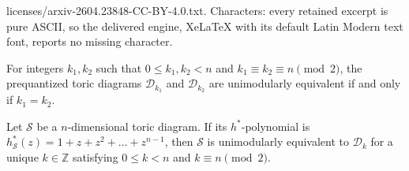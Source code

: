 \documentclass[10pt,a4paper]{amsart}
\newcommand{\Ss}{{\mathcal S}}
\newcommand{\Z}{\mathbb Z}
\begin{document}
licenses/arxiv-2604.23848-CC-BY-4.0.txt. Characters: every retained excerpt is pure ASCII, so the delivered engine, XeLaTeX with its default Latin Modern text font, reports no missing character.
\begin{theorem} \label{thm:uniqueness}
For integers $k_1, k_2$ such that $0 \le k_1, k_2 < n$ and $k_1 \equiv k_2 \equiv n \pmod 2$, the prequantized 
toric diagrams $\mathcal{D}_{k_1}$ and $\mathcal{D}_{k_2}$ are unimodularly equivalent if and only if $k_1 = k_2$.
\end{theorem}

\begin{theorem} \label{thm:bipysimplex2}
Let $\Ss$ be a $n$-dimensional toric diagram. If its $h^*$-polynomial is $h_{\Ss}^\ast (z) = 1 + z + z^2 + \dots + z^{n-1}$, 
then $\Ss$ is unimodularly equivalent to $\mathcal{D}_k$ for a unique $k\in\Z$ satisfying $0 \le k < n$ and 
$k \equiv n \pmod 2$.
\end{theorem}
\end{document}
